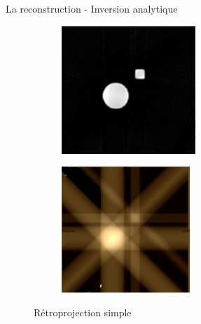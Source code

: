 \documentclass{beamer}
\begin{document}
\begin{frame}{La reconstruction - Inversion analytique}
    \begin{figure}[t]
        \centering
        \begin{subfigure}[b]{0.42\textwidth}
            \includegraphics[width=\textwidth]{retrop.png}
        \end{subfigure}
        \qquad \qquad 
        \pause
        \begin{subfigure}[b]{0.42\textwidth}
            \includegraphics[width=\textwidth]{retrop_simple copie.jpeg}
        \end{subfigure}
        \caption{Rétroprojection simple}
    \end{figure}
\end{frame}
\end{document}
